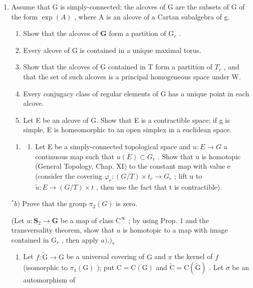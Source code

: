 
\begin{enumerate}
\def\labelenumi{\arabic{enumi})}
\item
  Assume that G is simply-connected; the alcoves of G are the subsets of G of the form \(\exp(A)\) , where A is an alcove of a Cartan subalgebra of g.

\begin{enumerate}
\def\labelenumi{\alph{enumi})}
\item
  Show that the alcoves of \(\mathbf{G}\) form a partition of \(\mathrm{G}_r\) .
\item
  Every alcove of G is contained in a unique maximal torus.
\item
  Show that the alcoves of G contained in T form a partition of \(T_{r}\) , and that the set of such alcoves is a principal homogeneous space under W.
\item
  Every conjugacy class of regular elements of G has a unique point in each alcove.
\item
  Let E be an alcove of G. Show that E is a contractible space; if g is simple, E is homeomorphic to an open simplex in a euclidean space.
\end{enumerate}

\begin{enumerate}
\def\labelenumi{\arabic{enumi})}
\setcounter{enumi}{1}
\tightlist
\item
  \begin{enumerate}
  \def\labelenumii{\alph{enumii})}
  \tightlist
  \item
    Let E be a simply-connected topological space and \(u : E \to G\) a continuous map such that \(u(E) \subset G_r\) . Show that u is homotopic (General Topology, Chap. XI) to the constant map with value e (consider the covering \(\varphi_r : (G/T) \times t_r \to G_r\) ; lift u to \(\tilde{u} : E \to (G/T) \times t\) , then use the fact that t is contractible).
  \end{enumerate}
\end{enumerate}

\(^{*}b)\) Prove that the group \(\pi_{2}(G)\) is zero.

(Let \(u: \mathbf{S}_2 \to \mathbf{G}\) be a map of class \(\mathrm{C}^\infty\) ; by using Prop. 1 and the transversality theorem, show that \(u\) is homotopic to a map with image contained in \(\mathrm{G}_r\) , then apply \(a).)_*\)

\begin{enumerate}
\def\labelenumi{\arabic{enumi})}
\setcounter{enumi}{2}
\tightlist
\item
  Let \(f: \tilde{\mathrm{G}} \to \mathrm{G}\) be a universal covering of \(\mathrm{G}\) and \(\pi\) the kernel of \(f\) (isomorphic to \(\pi_1(\mathrm{G})\) ); put \(\mathrm{C} = \mathrm{C}(\mathrm{G})\) and \(\tilde{\mathrm{C}} = \mathrm{C}(\tilde{\mathrm{G}})\) . Let \(\sigma\) be an automorphism of
\end{enumerate}


\end{enumerate}
